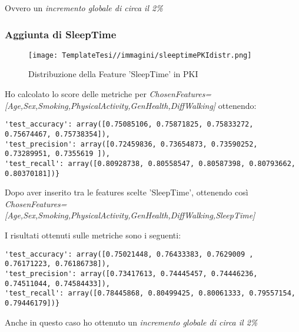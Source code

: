\begin{flushleft}
Ovvero un \emph{incremento globale di circa il 2\%}


\subsubsection{Aggiunta di SleepTime}
\begin{figure}[H]
    \centering
    \texttt{[image: TemplateTesi//immagini/sleeptimePKIdistr.png]}
    \caption{Distribuzione della Feature 'SleepTime' in PKI}
    \label{fig:distrsleeppki}
\end{figure}

Ho calcolato lo score delle metriche per 
\newline
\emph{ChosenFeatures=[Age,Sex,Smoking,PhysicalActivity,GenHealth,DiffWalking]}
\newline
ottenendo:
\begin{lstlisting}
'test_accuracy': array([0.75085106, 0.75871825, 0.75833272, 0.75674467, 0.75738354]), 
'test_precision': array([0.72459836, 0.73654873, 0.73590252, 0.73289951, 0.7355619 ]), 
'test_recall': array([0.80928738, 0.80558547, 0.80587398, 0.80793662, 0.80370181])}
\end{lstlisting}
Dopo aver inserito tra le features scelte 'SleepTime', ottenendo così 
\newline
\emph{ChosenFeatures=[Age,Sex,Smoking,PhysicalActivity,GenHealth,DiffWalking,SleepTime]}

I risultati ottenuti sulle metriche sono i seguenti:

\begin{lstlisting}
'test_accuracy': array([0.75021448, 0.76433383, 0.7629009 , 0.76171223, 0.76186738]), 
'test_precision': array([0.73417613, 0.74445457, 0.74446236, 0.74511044, 0.74584433]), 
'test_recall': array([0.78445868, 0.80499425, 0.80061333, 0.79557154, 0.79446179])}
\end{lstlisting}

Anche in questo caso ho ottenuto un \emph{incremento globale di circa il 2\%}
\end{flushleft}


